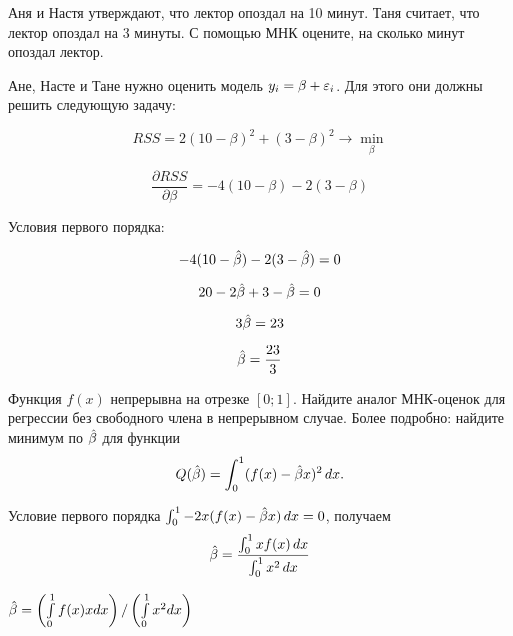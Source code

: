 \begin{problem} %
Аня и Настя утверждают, что лектор опоздал на 10 минут. Таня считает, что лектор опоздал на 3 минуты. С помощью МНК оцените, на сколько минут опоздал лектор.

\begin{sol}

Ане, Насте и Тане нужно оценить модель $y_i = \beta + \varepsilon_i$. Для этого они должны решить следующую задачу:

\[RSS = 2(10-\beta)^2 + (3-\beta)^2\rightarrow \min \limits_{\beta}\]

\[\frac{\partial RSS}{\partial \beta} = -4(10-\beta)-2(3-\beta) \]

Условия первого порядка:

\[-4(10-\hat{\beta})-2(3-\hat{\beta})=0\]

\[20 - 2\hat{\beta} +3 -\hat{\beta}=0\]

\[3\hat{\beta} = 23\]

\[\hat{\beta} = \frac{23}{3}\]

\end{sol}
\end{problem}



\begin{problem} %
Функция $f(x)$ непрерывна на отрезке $[0;1]$. Найдите аналог МНК-оценок для регрессии без свободного члена в непрерывном случае. Более подробно: найдите минимум по $\hat{\beta}$ для функции
\[
Q(\hat{\beta})= \int_0^1 (f(x)-\hat{\beta} x)^2\,dx.
\]

\begin{sol}
Условие первого порядка $\int_0^1 -2x(f(x)-\hat{\beta} x) \, dx =0$, получаем
\[
\hat{\beta} = \frac{\int_0^1 x f(x)\, dx} {\int_0^1 x^2 \, dx}
\]

\(\hat{\beta} = \left(\int \limits_0^1 f(x) x dx\right) / \left(\int \limits_0^1 x^2 dx\right)\)
\end{sol}
\end{problem}



